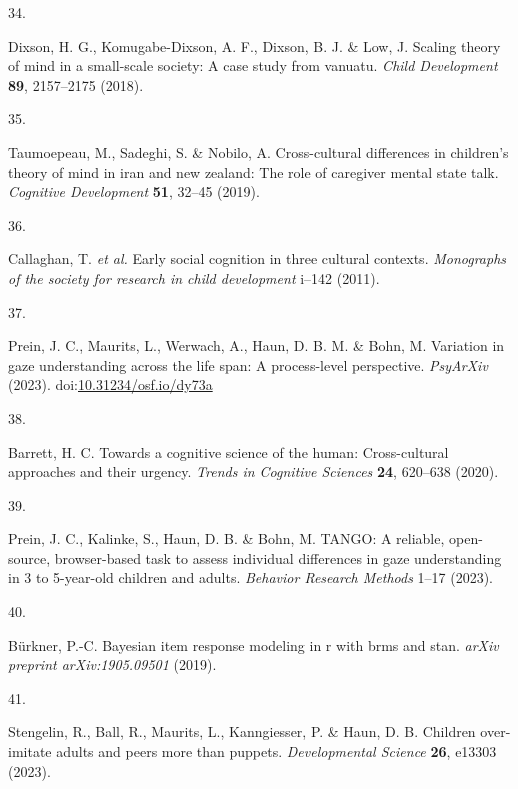 \documentclass[
  man,floatsintext]{apa6}
\newlength{\cslhangindent}
\newlength{\csllabelwidth}
\newlength{\cslentryspacingunit} %
\newenvironment{CSLReferences}[2] %
 {%
  \setlength{\parindent}{0pt}
  \ifodd #1
  \let\oldpar\par
  \def\par{\hangindent=\cslhangindent\oldpar}
  \fi
  \setlength{\parskip}{#2\cslentryspacingunit}
 }%
 {}
\newcommand{\CSLLeftMargin}[1]{\parbox[t]{\csllabelwidth}{#1}}
\newcommand{\CSLRightInline}[1]{\parbox[t]{\linewidth - \csllabelwidth}{#1}\break}
\begin{document}
\begin{CSLReferences}{0}{0}
\leavevmode{}%
\CSLLeftMargin{34. }%
\CSLRightInline{Dixson, H. G., Komugabe-Dixson, A. F., Dixson, B. J. \& Low, J. Scaling theory of mind in a small-scale society: A case study from vanuatu. \emph{Child Development} \textbf{89}, 2157--2175 (2018).}

\leavevmode{}%
\CSLLeftMargin{35. }%
\CSLRightInline{Taumoepeau, M., Sadeghi, S. \& Nobilo, A. Cross-cultural differences in children's theory of mind in iran and new zealand: The role of caregiver mental state talk. \emph{Cognitive Development} \textbf{51}, 32--45 (2019).}

\leavevmode{}%
\CSLLeftMargin{36. }%
\CSLRightInline{Callaghan, T. \emph{et al.} Early social cognition in three cultural contexts. \emph{Monographs of the society for research in child development} i--142 (2011).}

\leavevmode{}%
\CSLLeftMargin{37. }%
\CSLRightInline{Prein, J. C., Maurits, L., Werwach, A., Haun, D. B. M. \& Bohn, M. Variation in gaze understanding across the life span: {A} process-level perspective. \emph{{PsyArXiv}} (2023). doi:\href{https://doi.org/10.31234/osf.io/dy73a}{10.31234/osf.io/dy73a}}

\leavevmode{}%
\CSLLeftMargin{38. }%
\CSLRightInline{Barrett, H. C. Towards a cognitive science of the human: Cross-cultural approaches and their urgency. \emph{Trends in Cognitive Sciences} \textbf{24}, 620--638 (2020).}

\leavevmode{}%
\CSLLeftMargin{39. }%
\CSLRightInline{Prein, J. C., Kalinke, S., Haun, D. B. \& Bohn, M. TANGO: A reliable, open-source, browser-based task to assess individual differences in gaze understanding in 3 to 5-year-old children and adults. \emph{Behavior Research Methods} 1--17 (2023).}

\leavevmode{}%
\CSLLeftMargin{40. }%
\CSLRightInline{Bürkner, P.-C. Bayesian item response modeling in r with brms and stan. \emph{arXiv preprint arXiv:1905.09501} (2019).}

\leavevmode{}%
\CSLLeftMargin{41. }%
\CSLRightInline{Stengelin, R., Ball, R., Maurits, L., Kanngiesser, P. \& Haun, D. B. Children over-imitate adults and peers more than puppets. \emph{Developmental Science} \textbf{26}, e13303 (2023).}


\end{CSLReferences}
\end{document}
